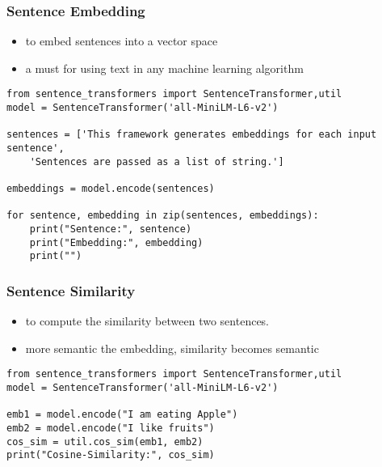 \begin{frame}[fragile]\frametitle{Sentence Embedding}

\begin{itemize}
\item to embed sentences into a vector space
\item a must for using text in any machine learning algorithm
\end{itemize}


\begin{lstlisting}
from sentence_transformers import SentenceTransformer,util
model = SentenceTransformer('all-MiniLM-L6-v2')

sentences = ['This framework generates embeddings for each input sentence',
    'Sentences are passed as a list of string.']

embeddings = model.encode(sentences)

for sentence, embedding in zip(sentences, embeddings):
    print("Sentence:", sentence)
    print("Embedding:", embedding)
    print("")

\end{lstlisting}

\end{frame}


\begin{frame}[fragile]\frametitle{Sentence Similarity}

\begin{itemize}
\item to compute the similarity between two sentences.
\item more semantic the embedding, similarity becomes semantic
\end{itemize}


\begin{lstlisting}
from sentence_transformers import SentenceTransformer,util
model = SentenceTransformer('all-MiniLM-L6-v2')

emb1 = model.encode("I am eating Apple")
emb2 = model.encode("I like fruits")
cos_sim = util.cos_sim(emb1, emb2)
print("Cosine-Similarity:", cos_sim)
\end{lstlisting}

\end{frame}

